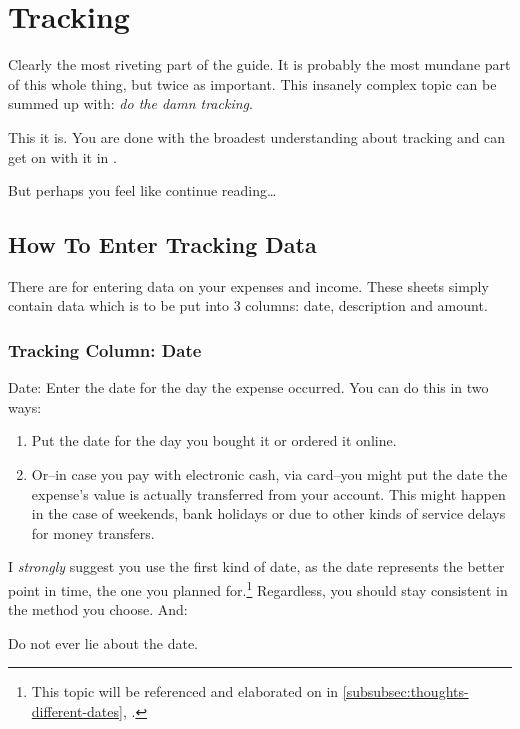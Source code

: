\section{Tracking}
\label{sec:Tracking}

Clearly the most riveting part of the guide.
It is probably the most mundane part of this whole thing, but twice as important.
This insanely complex topic can be summed up with: \emph{do the damn tracking}.

This it is.
You are done with the broadest understanding about tracking and can get on with it in \tfn.

But perhaps you feel like continue reading\ldots

\subsection{How To Enter Tracking Data}
\label{subsec:enter-tracking-data}

There are  for entering data on your expenses and income.
These sheets simply contain data which is to be put into 3 columns: date, description and amount.

\subsubsection{Tracking Column: Date}
\label{subsec:tracking-column-date}

Date: Enter the date for the day the expense occurred.
You can do this in two ways:
\begin{enumerate}
	\item Put the date for the day you bought it or ordered it online.
	\item Or--in case you pay with electronic cash, \eg via card--you might put the date the expense's value is actually transferred from your account.
	This might happen in the case of weekends, bank holidays or due to other kinds of service delays for money transfers.
\end{enumerate}
I \emph{strongly} suggest you use the first kind of date, as the date represents the better point in time, \ie the one you planned for.\footnote{This topic will be referenced and elaborated on in \autoref{subsubsec:thoughts-different-dates}, .}
Regardless, you should stay consistent in the method you choose.
And:

\begin{center}
	Do not ever lie about the date.
\end{center}

